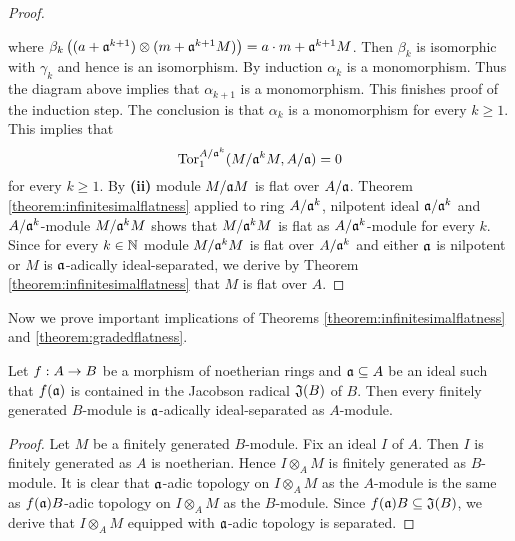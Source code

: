 \begin{proof}
\begin{center}
\end{center}
where $\beta_{k}\left((a+\mathfrak{a}^{k+1})\otimes (m+\mathfrak{a}^{k+1}M)\right) = a\cdot m+\mathfrak{a}^{k+1}M$. Then $\beta_{k}$ is isomorphic with $\gamma_{k}$ and hence is an isomorphism. By induction $\alpha_k$ is a monomorphism. Thus the diagram above implies that $\alpha_{k+1}$ is a monomorphism. This finishes proof of the induction step. The conclusion is that $\alpha_k$ is a monomorphism for every $k\geq 1$. This implies that 
$$\mathrm{Tor}^{A/\mathfrak{a}^k}_1(M/\mathfrak{a}^kM,A/\mathfrak{a})=0$$
for every $k\geq 1$. By \textbf{(ii)} module $M/\mathfrak{a}M$ is flat over $A/\mathfrak{a}$. Theorem \ref{theorem:infinitesimalflatness} applied to ring $A/\mathfrak{a}^k$, nilpotent ideal $\mathfrak{a}/\mathfrak{a}^k$ and $A/\mathfrak{a}^k$-module $M/\mathfrak{a}^kM$ shows that $M/\mathfrak{a}^kM$ is flat as $A/\mathfrak{a}^k$-module for every $k$. Since for every $k\in {\mathbb N}$ module $M/\mathfrak{a}^kM$ is flat over $A/\mathfrak{a}^k$ and either $\mathfrak{a}$ is nilpotent or $M$ is $\mathfrak{a}$-adically ideal-separated, we derive by Theorem \ref{theorem:infinitesimalflatness} that $M$ is flat over $A$.
\end{proof}
\noindent
Now we prove important implications of Theorems \ref{theorem:infinitesimalflatness} and \ref{theorem:gradedflatness}.
\begin{fact}\label{fact:criterionforideal-separated}
Let $f:A\rightarrow B$ be a morphism of noetherian rings and $\mathfrak{a}\subseteq A$ be an ideal such that $f(\mathfrak{a})$ is contained in the Jacobson radical $\mathfrak{J}(B)$ of $B$. Then every finitely generated $B$-module is $\mathfrak{a}$-adically ideal-separated as $A$-module.
\end{fact}
\begin{proof}
Let $M$ be a finitely generated $B$-module. Fix an ideal $I$ of $A$. Then $I$ is finitely generated as $A$ is noetherian. Hence $I\otimes_AM$ is finitely generated as $B$-module. It is clear that $\mathfrak{a}$-adic topology on $I\otimes_AM$ as the $A$-module is the same as $f(\mathfrak{a})B$-adic topology on $I\otimes_AM$ as the $B$-module. Since $f(\mathfrak{a})B\subseteq \mathfrak{J}(B)$, we derive that $I\otimes_AM$ equipped with $\mathfrak{a}$-adic topology is separated.
\end{proof}
